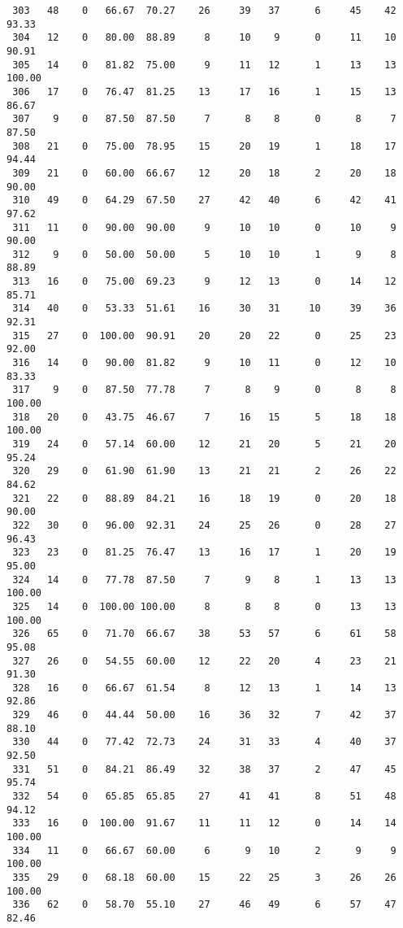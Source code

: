 \begin{verbatim}
 303   48    0   66.67  70.27    26     39   37      6     45    42    93.33
 304   12    0   80.00  88.89     8     10    9      0     11    10    90.91
 305   14    0   81.82  75.00     9     11   12      1     13    13   100.00
 306   17    0   76.47  81.25    13     17   16      1     15    13    86.67
 307    9    0   87.50  87.50     7      8    8      0      8     7    87.50
 308   21    0   75.00  78.95    15     20   19      1     18    17    94.44
 309   21    0   60.00  66.67    12     20   18      2     20    18    90.00
 310   49    0   64.29  67.50    27     42   40      6     42    41    97.62
 311   11    0   90.00  90.00     9     10   10      0     10     9    90.00
 312    9    0   50.00  50.00     5     10   10      1      9     8    88.89
 313   16    0   75.00  69.23     9     12   13      0     14    12    85.71
 314   40    0   53.33  51.61    16     30   31     10     39    36    92.31
 315   27    0  100.00  90.91    20     20   22      0     25    23    92.00
 316   14    0   90.00  81.82     9     10   11      0     12    10    83.33
 317    9    0   87.50  77.78     7      8    9      0      8     8   100.00
 318   20    0   43.75  46.67     7     16   15      5     18    18   100.00
 319   24    0   57.14  60.00    12     21   20      5     21    20    95.24
 320   29    0   61.90  61.90    13     21   21      2     26    22    84.62
 321   22    0   88.89  84.21    16     18   19      0     20    18    90.00
 322   30    0   96.00  92.31    24     25   26      0     28    27    96.43
 323   23    0   81.25  76.47    13     16   17      1     20    19    95.00
 324   14    0   77.78  87.50     7      9    8      1     13    13   100.00
 325   14    0  100.00 100.00     8      8    8      0     13    13   100.00
 326   65    0   71.70  66.67    38     53   57      6     61    58    95.08
 327   26    0   54.55  60.00    12     22   20      4     23    21    91.30
 328   16    0   66.67  61.54     8     12   13      1     14    13    92.86
 329   46    0   44.44  50.00    16     36   32      7     42    37    88.10
 330   44    0   77.42  72.73    24     31   33      4     40    37    92.50
 331   51    0   84.21  86.49    32     38   37      2     47    45    95.74
 332   54    0   65.85  65.85    27     41   41      8     51    48    94.12
 333   16    0  100.00  91.67    11     11   12      0     14    14   100.00
 334   11    0   66.67  60.00     6      9   10      2      9     9   100.00
 335   29    0   68.18  60.00    15     22   25      3     26    26   100.00
 336   62    0   58.70  55.10    27     46   49      6     57    47    82.46

\end{verbatim}
